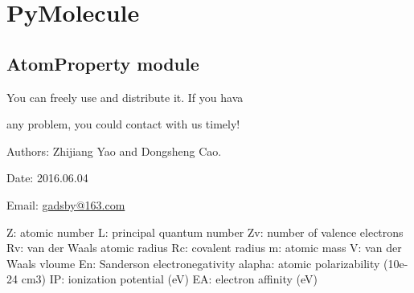 \documentclass[letterpaper,10pt,english]{sphinxmanual}
\begin{document}

\begin{fulllineitems}
\label{reference/PyDNAutil:PyDNAutil.Seq}
\end{fulllineitems}


\begin{fulllineitems}
\label{reference/PyDNAutil:PyDNAutil.StandardDeviation}
\end{fulllineitems}


\begin{fulllineitems}
\label{reference/PyDNAutil:PyDNAutil.WriteLibsvm}
\end{fulllineitems}



\section{PyMolecule}
\label{reference/PyMolecule:pymolecule}\label{reference/PyMolecule::doc}

\subsection{AtomProperty module}
\label{reference/AtomProperty:module-AtomProperty}\label{reference/AtomProperty::doc}\label{reference/AtomProperty:atomproperty-module}
You can freely use and distribute it. If you hava

any problem, you could contact with us timely!

Authors: Zhijiang Yao and Dongsheng Cao.

Date: 2016.06.04

Email: \href{mailto:gadsby@163.com}{gadsby@163.com}

Z: atomic number
L: principal quantum number
Zv: number of valence electrons
Rv: van der Waals atomic radius
Rc: covalent radius
m: atomic mass
V: van der Waals vloume
En: Sanderson electronegativity
alapha: atomic polarizability (10e-24 cm3)
IP: ionization potential (eV)
EA: electron affinity (eV)
\end{document}
